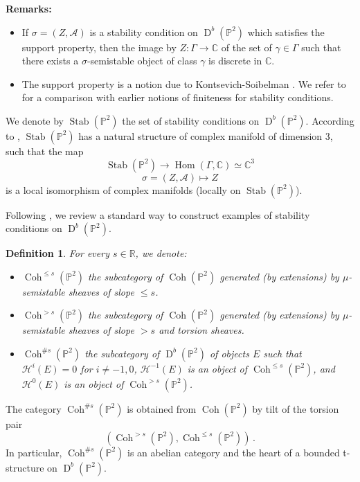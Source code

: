 \documentclass[12pt, a4paper]{amsart}
\newtheorem{defn}{Definition}[section]
\newcommand\C{\mathbb C}
\newcommand\PP{\mathbb P}
\newcommand\R{\mathbb R}
\newcommand\cA{\mathcal A}
\newcommand\cH{\mathcal H}
\newcommand\Coh{\operatorname{Coh}}
\newcommand\Hom{\operatorname{Hom}}
\newcommand\Stab{\operatorname{Stab}}
\newcommand\D{\operatorname{D}}
\begin{document}
\textbf{Remarks:} 
\begin{itemize}
\item[(i)] If $\sigma=(Z,\cA)$ is a stability condition on $\D^b(\PP^2)$
which satisfies the support property, then the image by $Z \colon \Gamma \rightarrow \C$
of the set of $\gamma \in \Gamma$ such that there exists a $\sigma$-semistable 
object of class $\gamma$ is discrete in $\C$.
\item[(ii)] The support property is a notion due to Kontsevich-Soibelman \cite[\S 1.2]{kontsevich2008stability}. 
We refer to 
\cite[Appendix B]{MR2852118} for a comparison with earlier notions of finiteness  for stability conditions.
\end{itemize}

We denote by $\Stab(\PP^2)$ the set of stability conditions on $\D^b(\PP^2)$.
According to \cite{MR2373143}, $\Stab(\PP^2)$ has a natural structure of complex manifold of dimension $3$, such that the map
\[ \Stab(\PP^2) \rightarrow \Hom(\Gamma,\C) \simeq \C^3\]
\[ \sigma=(Z,\cA) \mapsto Z\]
is a local isomorphism of complex manifolds
(locally on $\Stab(\PP^2)$).

Following \cite{MR2376815, MR2998828, MR2852118, MR3010070},
we review a standard way to construct examples of stability conditions on 
$\D^b (\PP^2)$.

\begin{defn} \label{defn_heart}
For every $s \in \R$, we denote:
\begin{itemize}
    \item[(i)] $\Coh^{\leqslant s}(\PP^2)$ the subcategory of 
    $\Coh(\PP^2)$ generated (by extensions) by 
    $\mu$-semistable sheaves of slope $\leqslant s$.
    \item[(ii)] $\Coh^{>s}(\PP^2)$ the subcategory of $\Coh(\PP^2)$
    generated (by extensions) by $\mu$-semistable sheaves of slope
    $>s$ and torsion sheaves.
    \item[(iii)] $\Coh^{\texttt{\#} s}(\PP^2)$ the subcategory of $\D^b(\PP^2)$
    of objects $E$ such that $\cH^i(E)=0$ for $i \neq -1, 0$,
    $\cH^{-1}(E)$ is an object of $\Coh^{\leqslant s}(\PP^2)$,
    and $\cH^{0}(E)$ is an object of $\Coh^{>s}(\PP^2)$.
\end{itemize}
\end{defn}

The category $\Coh^{\texttt{\#}s}(\PP^2)$ is obtained from 
$\Coh(\PP^2)$ by tilt of the torsion pair 
\[(\Coh^{> s}(\PP^2), \Coh^{\leqslant s}(\PP^2))\,.\]
In particular, $\Coh^{\texttt{\#}s}(\PP^2)$ is an abelian category and the heart of a bounded
t-structure on $\D^b(\PP^2)$.
\end{document}
